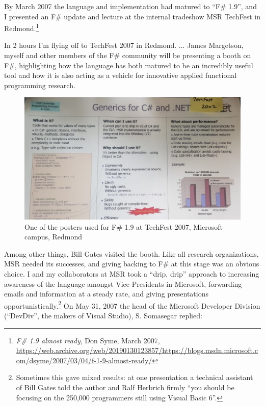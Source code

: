 \documentclass[acmsmall]{acmart}\settopmatter{}
\begin{document}
By March 2007 the language and implementation had matured to “F\# 1.9”, and I presented an F\# update and lecture at the internal tradeshow MSR TechFest in Redmond.\footnote{\textit{F\# 1.9 almost ready}, Don Syme, March 2007, \url{https://web.archive.org/web/20190130123857/https://blogs.msdn.microsoft.com/dsyme/2007/03/04/f-1-9-almost-ready/}}

\begin{verbquote}
In 2 hours I'm flying off to TechFest 2007 in Redmond. ... James Margetson, myself and other members of the F# community
will be presenting a booth on F#, highlighting how the language has both matured to be an incredibly useful tool and how it is
also acting as a vehicle for innovative applied functional programming research.
\end{verbquote}

\begin{figure}
  \includegraphics[width=0.9\linewidth]{fig1.jpg}
  \caption{One of the posters used for F\# 1.9 at TechFest 2007, Microsoft campus, Redmond}
  \label{fig:fig3}
\end{figure}

Among other things, Bill Gates visited the booth. Like all research organizations, MSR needed its successes, and
giving backing to F\# at this stage was an obvious choice. I and my collaborators at MSR took a “drip, drip” approach
to increasing awareness of the language amongst Vice Presidents in Microsoft, forwarding emails and information at
a steady rate, and giving presentations opportunistically.\footnote{Sometimes this gave mixed results: at one presentation
a technical assistant of Bill Gates told the author and Ralf Herbrich firmly “you should be focusing on the 250,000 programmers still using Visual Basic 6”.}   On May 31,
2007 the head of the Microsoft Developer Division (“DevDiv”, the makers of Visual Studio), S. Somasegar replied:
\end{document}
